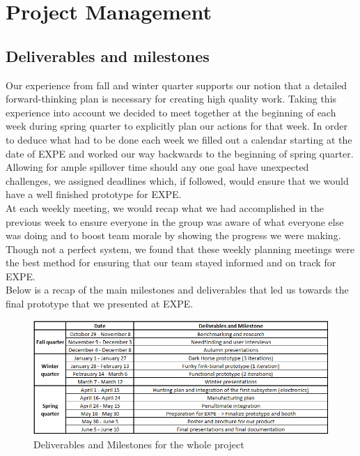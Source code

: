 \chapter{Project Management}
\label{Project_Management}

\section{Deliverables and milestones}

Our experience from fall and winter quarter supports our notion that a detailed forward-thinking plan is necessary for creating high quality work. Taking this experience into account we decided to meet together at the beginning of each week during spring quarter to explicitly plan our actions for that week. In order to deduce what had to be done each week we filled out a calendar starting at the date of EXPE and worked our way backwards to the beginning of spring quarter. Allowing for ample spillover time should any one goal have unexpected challenges, we assigned deadlines which, if followed, would ensure that we would have a well finished prototype for EXPE.\\
At each weekly meeting, we would recap what we had accomplished in the previous week to ensure everyone in the group was aware of what everyone else was doing and to boost team morale by showing the progress we were making. Though not a perfect system, we found that these weekly planning meetings were the best method for ensuring that our team stayed informed and on track for EXPE.\\
Below is a recap of the main milestones and deliverables that led us towards the final prototype that we presented at EXPE. 

\begin{figure}[h]
  \centering
     \includegraphics[scale=0.8]{images/planning.png}
   \caption{Deliverables and Milestones for the whole project}
  \label{fig:planning}
\end{figure}

